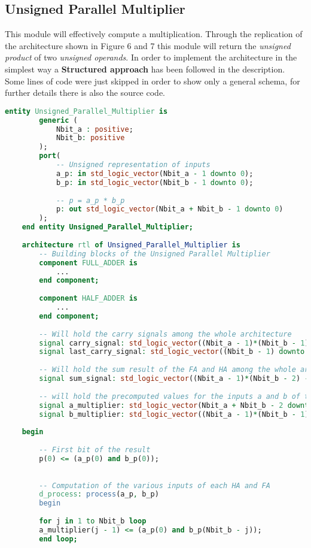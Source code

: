 \subsection{Unsigned Parallel Multiplier}
This module will effectively compute a multiplication. Through the replication of the architecture shown in Figure 6 and 7 this module will return the \textit{unsigned product} of two \textit{unsigned operands}. In order to implement the architecture in the simplest way a \textbf{Structured approach} has been followed in the description. Some lines of code were just skipped in order to show only a general schema, for further details there is also the source code.
\begin{lstlisting}[language=VHDL]
	entity Unsigned_Parallel_Multiplier is
		generic (
			Nbit_a : positive; 
			Nbit_b: positive
		);
		port(
			-- Unsigned representation of inputs
			a_p: in std_logic_vector(Nbit_a - 1 downto 0);
			b_p: in std_logic_vector(Nbit_b - 1 downto 0);
			
			-- p = a_p * b_p
			p: out std_logic_vector(Nbit_a + Nbit_b - 1 downto 0)
		);
	end entity Unsigned_Parallel_Multiplier;
	
	architecture rtl of Unsigned_Parallel_Multiplier is
		-- Building blocks of the Unsigned Parallel Multiplier
		component FULL_ADDER is
			...
		end component;
		
		component HALF_ADDER is
			...
		end component;
		
		-- Will hold the carry signals among the whole architecture
		signal carry_signal: std_logic_vector((Nbit_a - 1)*(Nbit_b - 1) - 1 downto 0);
		signal last_carry_signal: std_logic_vector((Nbit_b - 1) downto 0);
		
		-- Will hold the sum result of the FA and HA among the whole architecture
		signal sum_signal: std_logic_vector((Nbit_a - 1)*(Nbit_b - 2) - 1 downto 0);  
		
		-- will hold the precomputed values for the inputs a and b of the various Half Adder and Full Adder
		signal a_multiplier: std_logic_vector(Nbit_a + Nbit_b - 2 downto 0);
		signal b_multiplier: std_logic_vector((Nbit_a - 1)*(Nbit_b - 1) - 1 downto 0);
	
	begin
		
		-- First bit of the result
		p(0) <= (a_p(0) and b_p(0));
		
		
		-- Computation of the various inputs of each HA and FA
		d_process: process(a_p, b_p)
		begin
		
		for j in 1 to Nbit_b loop
		a_multiplier(j - 1) <= (a_p(0) and b_p(Nbit_b - j));
		end loop;
		

\end{lstlisting}
